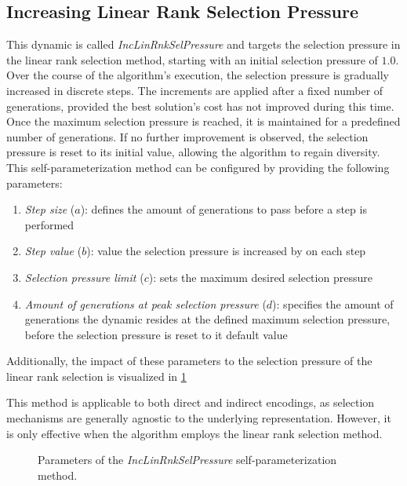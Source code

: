 \documentclass[english,examples]{isasthesis}
\begin{document}
\subsection{Increasing Linear Rank Selection Pressure}
\label{IncreasingLinearRankSelectionPressure}
This dynamic is called \textit{IncLinRnkSelPressure} and targets the selection
pressure in the linear rank selection method, starting with an initial selection
pressure of $1.0$. Over the course of the algorithm's execution, the selection
pressure is gradually increased in discrete steps. The increments are applied
after a fixed number of generations, provided the best solution's cost has not
improved during this time. Once the maximum selection pressure is reached, it
is maintained for a predefined number of generations. If no further improvement
is observed, the selection pressure is reset to its initial value, allowing the
algorithm to regain diversity. This self-parameterization method can be
configured by providing the following parameters:
\begin{enumerate}
    \item   \textit{Step size} ($a$): defines the amount of generations to pass
            before a step is performed
    \item   \textit{Step value} ($b$): value the selection pressure is
            increased by on each step
    \item   \textit{Selection pressure limit} ($c$): sets the maximum desired
            selection pressure
    \item   \textit{Amount of generations at peak selection pressure} ($d$):
            specifies the amount of generations the dynamic resides at the
            defined maximum selection pressure, before the selection pressure
            is reset to it default value
\end{enumerate}
Additionally, the impact of these parameters to the selection pressure of
the linear rank selection is visualized in \ref{fig:inc_lin_rnk}

This method is applicable to both direct and indirect encodings, as selection
mechanisms are generally agnostic to the underlying representation. However,
it is only effective when the algorithm employs the linear rank selection
method.

\begin{figure}[h!]
    \centering
    
    \caption{
        Parameters of the \textit{IncLinRnkSelPressure} self-parameterization
        method.
    }
    \label{fig:inc_lin_rnk}
\end{figure}
\end{document}
